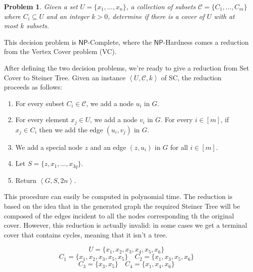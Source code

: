 \documentclass[12pt,a4paper]{article}
\newtheorem{problem}{Problem}
\newcommand{\abk}[1]{\left\langle#1\right\rangle}
\begin{document}
    \begin{problem}
        Given a set $U = \{x_1, \ldots, x_n\}$, a collection of subsets $\mathcal{C} = \{C_1, \ldots, C_m\}$ where $C_i \subseteq U$ and an integer $k > 0$, determine if there is a cover of $U$ with at most $k$ subsets.
    \end{problem}

    This decision problem is $\mathsf{NP}$-Complete, where the $\mathsf{NP}$-Hardness comes a reduction from the Vertex Cover problem (VC).

    \newpage

    After defining the two decision problems, we're ready to give a reduction from Set Cover to Steiner Tree. Given an instance $\abk{U,\mathcal{C}, k}$ of SC, the reduction proceeds as follows:
    \begin{enumerate}
        \item For every subset $C_i \in \mathcal{C}$, we add a node $u_i$ in $G$.
        \item For every element $x_j \in U$, we add a node $v_i$ in $G$. For every $i \in [m]$, if $x_j \in C_i$ then we add the edge $(u_i, v_j)$ in $G$.
        \item We add a special node $z$ and an edge $(z, u_i)$ in $G$ for all $i \in [m]$.
        \item Let $S = \{z, x_1, \ldots, x_{3q}\}$.
        \item Return $\abk{G,S,2n}$.
    \end{enumerate}

    This procedure can easily be computed in polynomial time. The reduction is based on the idea that in the generated graph the required Steiner Tree will be composed of the edges incident to all the nodes corresponding th the original cover. However, this reduction is actually invalid: in some cases we get a terminal cover that contains cycles, meaning that it isn't a tree.

    \[U = \{x_1, x_2, x_3, x_4, x_5, x_6\}\]
    \[C_1 = \{x_1, x_2, x_3, x_5, x_5\} \quad C_2 = \{x_1, x_3, x_5, x_6\} \]
    \[C_3 = \{x_3, x_5\} \quad C_4 = \{x_1, x_4, x_6\}\]
\end{document}
